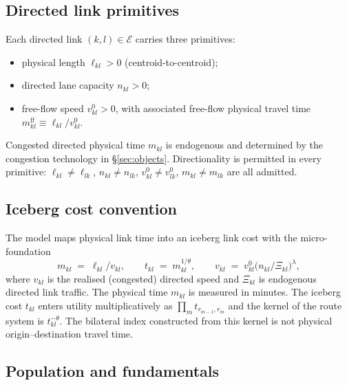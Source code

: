 \documentclass[12pt]{article}
\newcommand{\E}{\mathcal E}
\newcommand{\tbar}{m^{\mathrm{ff}}}
\newcommand{\mkl}{m_{kl}}
\newcommand{\tkl}{t_{kl}}
\begin{document}
\subsection{Directed link primitives}

Each directed link $(k,l)\in\E$ carries three primitives:
\begin{itemize}[leftmargin=2em,itemsep=0.2em]
  \item physical length $\ell_{kl}>0$ (centroid-to-centroid);
  \item directed lane capacity $n_{kl}>0$;
  \item free-flow speed $v^{0}_{kl}>0$, with associated free-flow
        physical travel time $\tbar_{kl}\equiv\ell_{kl}/v^{0}_{kl}$.
\end{itemize}
Congested directed physical time $\mkl$ is endogenous and
determined by the congestion technology in
\S\ref{sec:objects}.  Directionality is permitted in every primitive:
$\ell_{kl}\ne\ell_{lk}$, $n_{kl}\ne n_{lk}$, $v^{0}_{kl}\ne v^{0}_{lk}$,
$\mkl\ne m_{lk}$ are all admitted.

\subsection{Iceberg cost convention}\label{ssec:iceberg}

The model maps physical link time into an iceberg link cost with the
\citet{AllenArkolakis2022} micro-foundation
\begin{equation}
  \mkl\;=\;\ell_{kl}/v_{kl},
  \qquad
  \tkl\;=\;\mkl^{1/\theta},
  \qquad
  v_{kl}\;=\;v^{0}_{kl}\bigl(n_{kl}/\Xi_{kl}\bigr)^{\lambda},
  \label{eq:iceberg}
\end{equation}
where $v_{kl}$ is the realised (congested) directed speed and
$\Xi_{kl}$ is endogenous directed link traffic. The physical time $\mkl$
is measured in minutes. The iceberg cost
$\tkl$ enters utility multiplicatively as
$\prod_m t_{r_{m-1},r_m}$ and the kernel of the route system is
$\tkl^{-\theta}$. The bilateral index constructed from this kernel is not
physical origin--destination travel time.

\subsection{Population and fundamentals}
\end{document}
